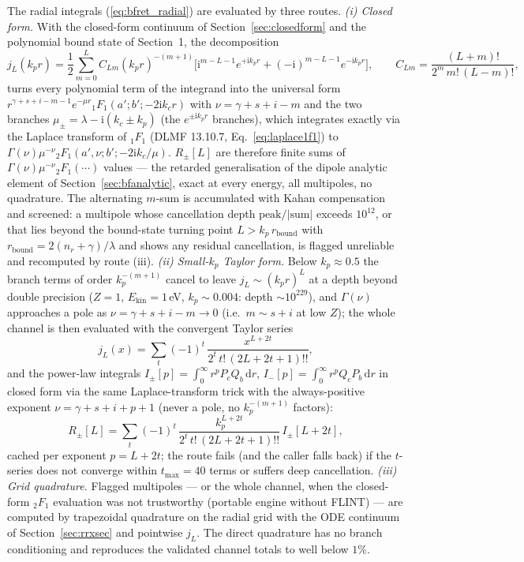 \documentclass[11pt,a4paper]{article}
\newcommand{\dif}{\mathrm{d}}
\newcommand{\iu}{\mathrm{i}}
\begin{document}
The radial integrals (\ref{eq:bfret_radial}) are evaluated by three
routes.
\emph{(i) Closed form.}  With the closed-form continuum of
Section~\ref{sec:closedform} and the polynomial bound state of Section~1,
the decomposition
\begin{equation}
  j_{L}(k_{p}r)=\frac12\sum_{m=0}^{L}C_{Lm}(k_{p}r)^{-(m+1)}
    \bigl[\iu^{m-L-1}e^{+\iu k_{p}r}
         +(-\iu)^{m-L-1}e^{-\iu k_{p}r}\bigr],
  \qquad
  C_{Lm}=\frac{(L+m)!}{2^{m}\,m!\,(L-m)!},
  \label{eq:bfret_jl}
\end{equation}
turns every polynomial term of the integrand into the universal form
$r^{\gamma+s+i-m-1}e^{-\mu r}{}_{1}F_{1}(a';b';-2\iu k_{c}r)$ with
$\nu=\gamma+s+i-m$ and the two branches
$\mu_{\pm}=\lambda-\iu(k_{c}\pm k_{p})$ (the $e^{\pm\iu k_{p}r}$
branches), which integrates exactly via the Laplace transform of
${}_{1}F_{1}$ (DLMF 13.10.7, Eq.~\ref{eq:laplace1f1}) to
$\Gamma(\nu)\mu^{-\nu}{}_{2}F_{1}(a',\nu;b';-2\iu k_{c}/\mu)$.
$R_{\pm}[L]$ are therefore finite sums of
$\Gamma(\nu)\mu^{-\nu}{}_{2}F_{1}(\cdots)$ values --- the retarded
generalisation of the dipole analytic element of
Section~\ref{sec:bfanalytic}, exact at every energy, all multipoles, no
quadrature.  The alternating $m$-sum is accumulated with Kahan
compensation and screened: a multipole whose cancellation depth
$\mathrm{peak}/|\text{sum}|$ exceeds $10^{12}$, or that lies beyond the
bound-state turning point $L>k_{p}\,r_{\mathrm{bound}}$ with
$r_{\mathrm{bound}}=2(n_{r}+\gamma)/\lambda$ and shows any residual
cancellation, is flagged unreliable and recomputed by route (iii).
\emph{(ii) Small-$k_{p}$ Taylor form.}  Below $k_{p}\approx0.5$ the
branch terms of order $k_{p}^{-(m+1)}$ cancel to leave
$j_{L}\sim(k_{p}r)^{L}$ at a depth beyond double precision ($Z=1$,
$E_{\mathrm{kin}}=1$\,eV, $k_{p}\sim0.004$: depth $\sim10^{229}$), and
$\Gamma(\nu)$ approaches a pole as $\nu=\gamma+s+i-m\to0$ (i.e.\
$m\sim s+i$ at low $Z$); the whole channel is then evaluated with the
convergent Taylor series
\begin{equation}
  j_{L}(x)=\sum_{t}(-1)^{t}\,
    \frac{x^{L+2t}}{2^{t}\,t!\,(2L+2t+1)!!},
  \label{eq:bfret_taylor}
\end{equation}
and the power-law integrals
$I_{\pm}[p]=\int_{0}^{\infty}r^{p}P_{c}Q_{b}\,\dif r$,
$I_{-}[p]=\int_{0}^{\infty}r^{p}Q_{c}P_{b}\,\dif r$ in closed form via
the same Laplace-transform trick with the always-positive exponent
$\nu=\gamma+s+i+p+1$ (never a pole, no $k_{p}^{-(m+1)}$ factors):
\begin{equation}
  R_{\pm}[L]=\sum_{t}(-1)^{t}\,
    \frac{k_{p}^{L+2t}}{2^{t}\,t!\,(2L+2t+1)!!}\,I_{\pm}[L+2t],
\end{equation}
cached per exponent $p=L+2t$; the route fails (and the caller falls
back) if the $t$-series does not converge within $t_{\max}=40$ terms or
suffers deep cancellation.
\emph{(iii) Grid quadrature.}  Flagged multipoles --- or the whole
channel, when the closed-form ${}_{2}F_{1}$ evaluation was not
trustworthy (portable engine without FLINT) --- are computed by
trapezoidal quadrature on the radial grid with the ODE continuum of
Section~\ref{sec:rrxsec} and pointwise $j_{L}$.  The direct quadrature
has no branch conditioning and reproduces the validated channel totals
to well below $1\%$.
\end{document}
